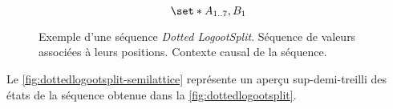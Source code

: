 \begin{figure}[tb]
\centering
\begin{subfigure}[b]{0.69\linewidth}
    \centering
    \caption{}
    \label{fig:dottedlogootsplit-1}
\end{subfigure}
\begin{subfigure}[b]{0.29\linewidth}
    \centering
    \begin{equation*}
        \set*{A_{\irange{1}{7}},B_1}
    \end{equation*}
    \caption{}
    \label{fig:dottedlogootsplit-2}
\end{subfigure}
\caption[Exemple d'une séquence \emph{LogootSplit}]{Exemple d'une séquence \emph{Dotted LogootSplit}.
 Séquence de valeurs associées à leurs positions.
 Contexte causal de la séquence.}
\label{fig:dottedlogootsplit}
\end{figure}

Le \autoref{fig:dottedlogootsplit-semilattice} représente un aperçu sup-demi-treilli des états de la séquence obtenue dans la \autoref{fig:dottedlogootsplit}.

